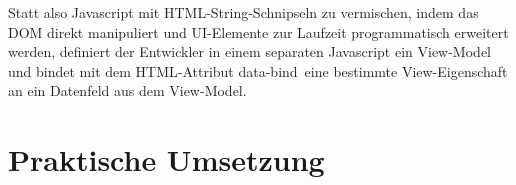 \documentclass{scrreprt}
\begin{document}
Statt also Javascript mit HTML-String-Schnipseln zu vermischen, indem das DOM direkt manipuliert und UI-Elemente zur Laufzeit
programmatisch erweitert werden, definiert der Entwickler in einem separaten Javascript ein View-Model und bindet mit dem HTML-Attribut \glqq data-bind\grqq \ eine bestimmte View-Eigenschaft an ein Datenfeld aus dem View-Model.


\chapter{Praktische Umsetzung}
\end{document}
